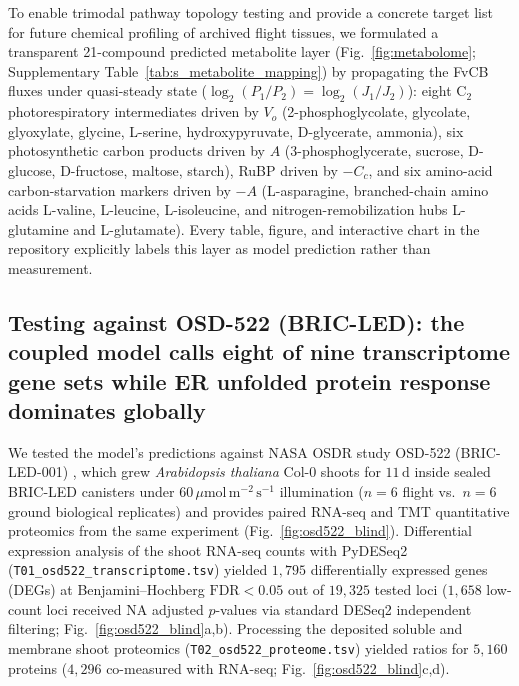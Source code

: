 \documentclass[preprint,11pt,numbers,sort&compress]{elsarticle}
\newcommand{\ums}{\ensuremath{\mu\mathrm{mol\,m^{-2}\,s^{-1}}}}
\begin{document}
To enable trimodal pathway topology testing and provide a concrete target list for future chemical profiling of archived flight tissues, we formulated a transparent 21-compound predicted metabolite layer (Fig.~\ref{fig:metabolome}; Supplementary Table~\ref{tab:s_metabolite_mapping}) by propagating the FvCB fluxes under quasi-steady state ($\log_2(P_1/P_2) = \log_2(J_1/J_2)$): eight $\mathrm{C_2}$ photorespiratory intermediates driven by $V_o$ (2-phosphoglycolate, glycolate, glyoxylate, glycine, L-serine, hydroxypyruvate, D-glycerate, ammonia), six photosynthetic carbon products driven by $A$ (3-phosphoglycerate, sucrose, D-glucose, D-fructose, maltose, starch), RuBP driven by $-C_c$, and six amino-acid carbon-starvation markers driven by $-A$ (L-asparagine, branched-chain amino acids L-valine, L-leucine, L-isoleucine, and nitrogen-remobilization hubs L-glutamine and L-glutamate). Every table, figure, and interactive chart in the repository explicitly labels this layer as model prediction rather than measurement.

\subsection{Testing against OSD-522 (BRIC-LED): the coupled model calls eight of nine transcriptome gene sets while ER unfolded protein response dominates globally}\label{sec:osd522}

We tested the model's predictions against NASA OSDR study OSD-522 (BRIC-LED-001) \citep{osd522}, which grew \textit{Arabidopsis thaliana} Col-0 shoots for $11\,\mathrm{d}$ inside sealed BRIC-LED canisters under $60\,\ums$ illumination ($n = 6$ flight vs.\ $n = 6$ ground biological replicates) and provides paired RNA-seq and TMT quantitative proteomics from the same experiment (Fig.~\ref{fig:osd522_blind}). Differential expression analysis of the shoot RNA-seq counts with PyDESeq2 \citep{pydeseq2} (\texttt{T01\_osd522\_transcriptome.tsv}) yielded $1{,}795$ differentially expressed genes (DEGs) at Benjamini--Hochberg $\mathrm{FDR}<0.05$ out of $19{,}325$ tested loci ($1{,}658$ low-count loci received $\mathrm{NA}$ adjusted $p$-values via standard DESeq2 independent filtering; Fig.~\ref{fig:osd522_blind}a,b). Processing the deposited soluble and membrane shoot proteomics (\texttt{T02\_osd522\_proteome.tsv}) yielded ratios for $5{,}160$ proteins ($4{,}296$ co-measured with RNA-seq; Fig.~\ref{fig:osd522_blind}c,d).
\end{document}

